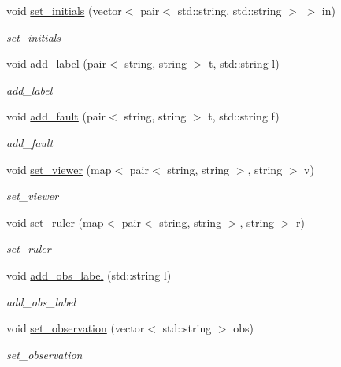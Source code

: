 \begin{DoxyCompactItemize}
void \hyperlink{class_problem_node_a5e085ece16170ff948a377d68fb4c55e}{set\+\_\+initials} (vector$<$ pair$<$ std\+::string, std\+::string $>$ $>$ in)
\begin{DoxyCompactList}\small\item\em set\+\_\+initials \end{DoxyCompactList}\item 
void \hyperlink{class_problem_node_ad0af55ddc077322259159752d090a3a0}{add\+\_\+label} (pair$<$ string, string $>$ t, std\+::string l)
\begin{DoxyCompactList}\small\item\em add\+\_\+label \end{DoxyCompactList}\item 
void \hyperlink{class_problem_node_ab7d4599d392a447b611ef873e3db1236}{add\+\_\+fault} (pair$<$ string, string $>$ t, std\+::string f)
\begin{DoxyCompactList}\small\item\em add\+\_\+fault \end{DoxyCompactList}\item 
void \hyperlink{class_problem_node_ab66497cb64a9938de688c69c829f32df}{set\+\_\+viewer} (map$<$ pair$<$ string, string $>$, string $>$ v)
\begin{DoxyCompactList}\small\item\em set\+\_\+viewer \end{DoxyCompactList}\item 
void \hyperlink{class_problem_node_abb26a57e5a160416fcd115d685a258a6}{set\+\_\+ruler} (map$<$ pair$<$ string, string $>$, string $>$ r)
\begin{DoxyCompactList}\small\item\em set\+\_\+ruler \end{DoxyCompactList}\item 
void \hyperlink{class_problem_node_ae14d133c72eebda9060f892e2a923eba}{add\+\_\+obs\+\_\+label} (std\+::string l)
\begin{DoxyCompactList}\small\item\em add\+\_\+obs\+\_\+label \end{DoxyCompactList}\item 
void \hyperlink{class_problem_node_aa83e75cbce1acfd5af82209373fdc716}{set\+\_\+observation} (vector$<$ std\+::string $>$ obs)
\begin{DoxyCompactList}\small\item\em set\+\_\+observation \end{DoxyCompactList}\item 

\end{DoxyCompactItemize}
